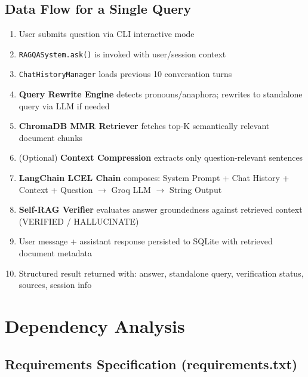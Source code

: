 \documentclass[12pt,a4paper]{article}
\begin{document}
\subsection{Data Flow for a Single Query}

\begin{enumerate}[leftmargin=*]
    \item User submits question via CLI interactive mode
    \item \texttt{RAGQASystem.ask()} is invoked with user/session context
    \item \texttt{ChatHistoryManager} loads previous 10 conversation turns
    \item \textbf{Query Rewrite Engine} detects pronouns/anaphora; rewrites to standalone query via LLM if needed
    \item \textbf{ChromaDB MMR Retriever} fetches top-K semantically relevant document chunks
    \item (Optional) \textbf{Context Compression} extracts only question-relevant sentences
    \item \textbf{LangChain LCEL Chain} composes: System Prompt + Chat History + Context + Question $\to$ Groq LLM $\to$ String Output
    \item \textbf{Self-RAG Verifier} evaluates answer groundedness against retrieved context (VERIFIED / HALLUCINATE)
    \item User message + assistant response persisted to SQLite with retrieved document metadata
    \item Structured result returned with: answer, standalone query, verification status, sources, session info
\end{enumerate}

\newpage

\section{Dependency Analysis}

\subsection{Requirements Specification (requirements.txt)}
\end{document}
